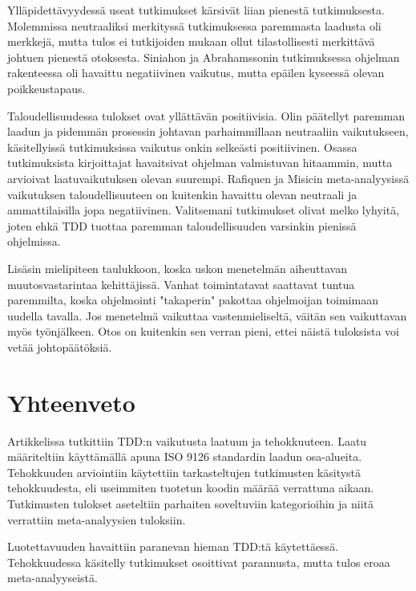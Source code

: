 \documentclass[finnish]{tktltiki2}
\theoremstyle{definition}
\theoremstyle{remark}
\begin{document}
Ylläpidettävyydessä useat tutkimukset kärsivät liian pienestä tutkimuksesta. Molemmissa neutraaliksi merkityssä tutkimuksessa paremmasta laadusta oli merkkejä, mutta tulos ei tutkijoiden mukaan ollut tilastollisesti merkittävä johtuen pienestä otoksesta. Siniahon ja Abrahamssonin tutkimuksessa ohjelman rakenteessa oli havaittu negatiivinen vaikutus, mutta epäilen kyseessä olevan poikkeustapaus. 

Taloudellisuudessa tulokset ovat yllättävän positiivisia. Olin päätellyt paremman laadun ja pidemmän prosessin johtavan parhaimmillaan neutraaliin vaikutukseen, käsitellyissä tutkimuksissa vaikutus onkin selkeästi positiivinen. Osassa tutkimuksista kirjoittajat havaitsivat ohjelman valmistuvan hitaammin, mutta arvioivat laatuvaikutuksen olevan suurempi. Rafiquen ja Misicin meta-analyysissä vaikutuksen taloudellisuuteen on kuitenkin havaittu olevan neutraali ja ammattilaisilla jopa negatiivinen. Valitsemani tutkimukset olivat melko lyhyitä, joten ehkä TDD tuottaa paremman taloudellisuuden varsinkin pienissä ohjelmissa.

Lisäsin mielipiteen taulukkoon, koska uskon menetelmän aiheuttavan muutosvastarintaa kehittäjissä. Vanhat toimintatavat saattavat tuntua paremmilta, koska ohjelmointi "takaperin" pakottaa ohjelmoijan toimimaan uudella tavalla. Jos menetelmä vaikuttaa vastenmieliseltä, väitän sen vaikuttavan myös työnjälkeen. Otos on kuitenkin sen verran pieni, ettei näistä tuloksista voi vetää johtopäätöksiä. 

\section{Yhteenveto}

Artikkelissa tutkittiin TDD:n vaikutusta laatuun ja tehokkuuteen. Laatu määriteltiin käyttämällä apuna ISO 9126 standardin laadun osa-alueita. Tehokkuuden arviointiin käytettiin tarkasteltujen tutkimusten käsitystä tehokkuudesta, eli useimmiten tuotetun koodin määrää verrattuna aikaan. Tutkimusten tulokset aseteltiin parhaiten soveltuviin kategorioihin ja niitä verrattiin meta-analyysien tuloksiin.

Luotettavuuden havaittiin paranevan hieman TDD:tä käytettäessä. Tehokkuudessa käsitelly tutkimukset osoittivat parannusta, mutta tulos eroaa meta-analyyseistä.









 
\end{document}
